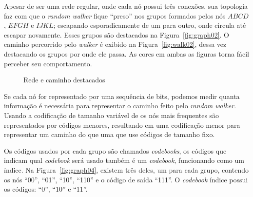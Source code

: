 \documentclass[
  article,
  11pt,
  a4paper,
  english,
  brazil,
  sumario=tradicional]{abntex2}
\begin{document}
Apesar de ser uma rede regular, onde cada nó possui três conexões, sua topologia faz com que o \textit{random walker} fique \enquote{preso} nos grupos formados pelos nós $ABCD$, $EFGH$ e $IJKL$; escapando esporadicamente de um para outro, onde circula até escapar novamente. Esses grupos são destacados na Figura~\ref{fig:graph02}. O caminho percorrido pelo \textit{walker} é exibido na Figura~\ref{fig:walk02}, dessa vez destacando os grupos por onde ele passa. As cores em ambas as figuras torna fácil perceber seu comportamento.

\begin{figure}[ht]
  \centering
  \caption{Rede e caminho destacados}
\end{figure}

Se cada nó for representado por uma sequência de bits, podemos medir quanta informação é necessária para representar o caminho feito pelo \textit{random walker}. Usando a codificação de tamanho variável de   os nós mais frequentes são representados por códigos menores, resultando em uma codificação menor para representar um caminho do que uma que use códigos de tamanho fixo.

Os códigos usados por cada grupo são chamados \textit{codebooks}, os códigos que indicam qual \textit{codebook} será usado também é um \textit{codebook}, funcionando como um índice. Na Figura~\ref{fig:graph04}, existem três deles, um para cada grupo, contendo os nós \enquote{00}, \enquote{01}, \enquote{10}, \enquote{110} e o código de saída \enquote{111}. O \textit{codebook} índice possui os códigos: \enquote{0}, \enquote{10} e \enquote{11}.
\end{document}
